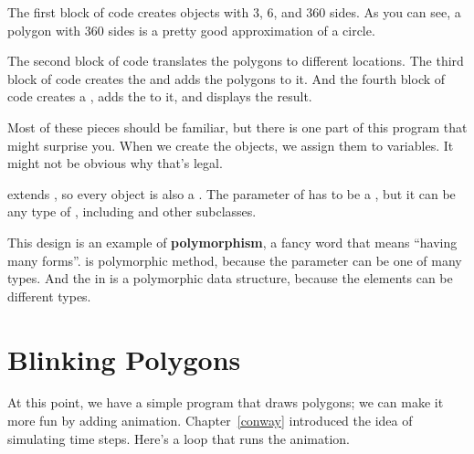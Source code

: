 The first block of code creates  objects with 3, 6, and 360 sides.
As you can see, a polygon with 360 sides is a pretty good approximation of a circle.

The second block of code translates the polygons to different locations.
The third block of code creates the  and adds the polygons to it.
And the fourth block of code creates a , adds the  to it, and displays the result.

Most of these pieces should be familiar, but there is one part of this program that might surprise you.
When we create the  objects, we assign them to  variables.
It might not be obvious why that's legal.


 extends , so every  object is also a .
The parameter of  has to be a , but it can be any type of , including  and other subclasses.


This design is an example of {\bf polymorphism}, a fancy word that means ``having many forms''.
 is polymorphic method, because the parameter can be one of many types.
And the  in  is a polymorphic data structure, because the elements can be different types.




\section{Blinking Polygons}

At this point, we have a simple program that draws polygons; we can make it more fun by adding animation.
Chapter~\ref{conway} introduced the idea of simulating time steps.
Here's a loop that runs the animation.

